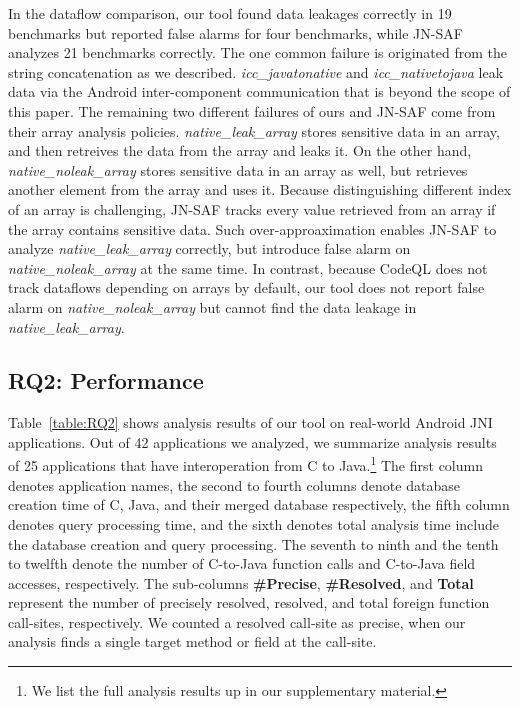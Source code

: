 In the dataflow comparison, our tool found data leakages correctly in 19
benchmarks but reported false alarms for four benchmarks, while JN-SAF analyzes
21 benchmarks correctly. The one common failure is originated from the string
concatenation as we described. {\it icc\_javatonative} and {\it
icc\_nativetojava} leak data via the Android inter-component communication that
is beyond the scope of this paper. The remaining two different failures of ours
and JN-SAF come from their array analysis policies. {\it native\_leak\_array}
stores sensitive data in an array, and then retreives the data from the array
and leaks it. On the other hand, {\it native\_noleak\_array} stores sensitive
data in an array as well, but retrieves another element from the array and uses
it. Because distinguishing different index of an array is challenging, JN-SAF
tracks every value retrieved from an array if the array contains sensitive
data. Such over-approaximation enables JN-SAF to analyze {\it
native\_leak\_array} correctly, but introduce false alarm on {\it
native\_noleak\_array} at the same time. In contrast, because CodeQL does not
track dataflows depending on arrays by default, our tool does not report false
alarm on {\it native\_noleak\_array} but cannot find the data leakage in {\it
native\_leak\_array}.


\subsection{RQ2: Performance}
Table~\ref{table:RQ2} shows analysis results of our tool on real-world Android
JNI applications. Out of 42 applications we analyzed, we summarize analysis
results of 25 applications that have interoperation from C to Java.\footnote{We
list the full analysis results up in our supplementary material.} The first
column denotes application names, the second to fourth columns denote database
creation time of C, Java, and their merged database respectively, the fifth
column denotes query processing time, and the sixth denotes total analysis time
include the database creation and query processing. The seventh to ninth and
the tenth to twelfth denote the number of C-to-Java function calls and
C-to-Java field accesses, respectively. The sub-columns {\bf #Precise}, {\bf
#Resolved}, and {\bf Total} represent the number of precisely resolved,
resolved, and total foreign function call-sites, respectively. We counted a
resolved call-site as precise, when our analysis finds a single target method
or field at the call-site.

